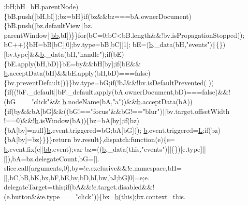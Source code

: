 \begin{DoxyCode}
      ;bH;bH=bH.parentNode)\{bB.push([bH,bI]);bz=bH\}\textcolor{keywordflow}{if}(bz&&bz===bA.ownerDocument)\{bB.push([bz.defaultView||bz.
      parentWindow||\hyperlink{jquery_8js_a1d6558865876e1c8cca029fce41a4bdb}{bb},bI])\}\}\textcolor{keywordflow}{for}(bC=0;bC<bB.length&&!bv.isPropagationStopped();bC++)\{bH=bB[bC][0];bv.type=bB[bC][1];
      bE=(\hyperlink{jquery_8js_aa4026ad5544b958e54ce5e106fa1c805}{b}.\_data(bH,\textcolor{stringliteral}{"events"})||\{\})[bv.type]&&\hyperlink{jquery_8js_aa4026ad5544b958e54ce5e106fa1c805}{b}.\_data(bH,\textcolor{stringliteral}{"handle"});\textcolor{keywordflow}{if}(bE)\{bE.apply(bH,bD)\}bE=by&&bH[by];\textcolor{keywordflow}{if}(bE&&
      \hyperlink{jquery_8js_aa4026ad5544b958e54ce5e106fa1c805}{b}.acceptData(bH)&&bE.apply(bH,bD)===\textcolor{keyword}{false})\{bv.preventDefault()\}\}bv.type=bG;\textcolor{keywordflow}{if}(!bJ&&!bv.isDefaultPrevented(
      ))\{\textcolor{keywordflow}{if}((!bF.\_default||bF.\_default.apply(bA.ownerDocument,bD)===\textcolor{keyword}{false})&&!(bG===\textcolor{stringliteral}{"click"}&&
      \hyperlink{jquery_8js_aa4026ad5544b958e54ce5e106fa1c805}{b}.nodeName(bA,\textcolor{stringliteral}{"a"}))&&\hyperlink{jquery_8js_aa4026ad5544b958e54ce5e106fa1c805}{b}.acceptData(bA))\{\textcolor{keywordflow}{if}(by&&bA[bG]&&((bG!==\textcolor{stringliteral}{"focus"}&&bG!==\textcolor{stringliteral}{"blur"})||bv.target.offsetWidth
      !==0)&&!\hyperlink{jquery_8js_aa4026ad5544b958e54ce5e106fa1c805}{b}.isWindow(bA))\{bz=bA[by];\textcolor{keywordflow}{if}(bz)\{bA[by]=null\}\hyperlink{jquery_8js_aa4026ad5544b958e54ce5e106fa1c805}{b}.event.triggered=bG;bA[bG]();
      \hyperlink{jquery_8js_aa4026ad5544b958e54ce5e106fa1c805}{b}.event.triggered=\hyperlink{jquery_8js_a38ee4c0b5f4fe2a18d0c783af540d253}{L};\textcolor{keywordflow}{if}(bz)\{bA[by]=bz\}\}\}\}\textcolor{keywordflow}{return} bv.result\},dispatch:\textcolor{keyword}{function}(e)\{e=
      \hyperlink{jquery_8js_aa4026ad5544b958e54ce5e106fa1c805}{b}.event.fix(e||\hyperlink{jquery_8js_a1d6558865876e1c8cca029fce41a4bdb}{bb}.event);var bz=((\hyperlink{jquery_8js_aa4026ad5544b958e54ce5e106fa1c805}{b}.\_data(\textcolor{keyword}{this},\textcolor{stringliteral}{"events"})||\{\})[e.type]||[]),bA=bz.delegateCount,bG=[].
      slice.call(arguments,0),by=!e.exclusive&&!e.namespace,bH=[],bC,bB,bK,bx,bF,bE,bv,bD,bI,bw,bJ;bG[0]=e;e.
      delegateTarget=\textcolor{keyword}{this};\textcolor{keywordflow}{if}(bA&&!e.target.disabled&&!(e.button&&e.type===\textcolor{stringliteral}{"click"}))\{bx=\hyperlink{jquery_8js_aa4026ad5544b958e54ce5e106fa1c805}{b}(\textcolor{keyword}{this});bx.context=this.

\end{DoxyCode}
